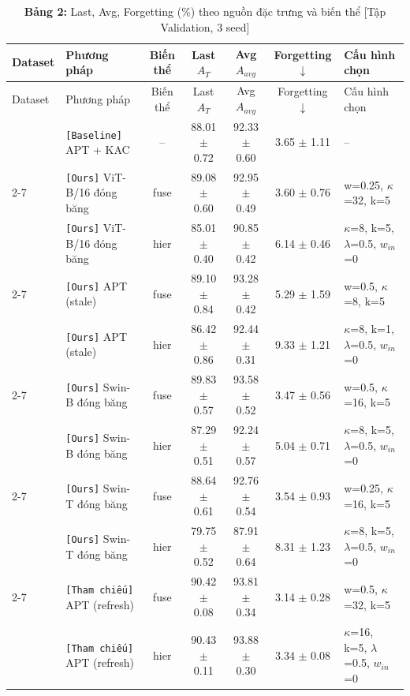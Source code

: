 \documentclass[10pt,a4paper]{article}
\newcommand{\src}[1]{\texttt{[#1]}}
\begin{document}
{\footnotesize
\setlength{\tabcolsep}{3pt}
\begin{longtable}{llcccc l}
\caption{\textbf{Bảng 2:} Last, Avg, Forgetting (\%) theo nguồn đặc trưng và biến thể [Tập Validation, 3 seed]}\\
\toprule
Dataset & Phương pháp & Biến thể & Last $A_T$ & Avg $A_{avg}$ & Forgetting $\downarrow$ & Cấu hình chọn \\
\midrule
\endfirsthead
\toprule
Dataset & Phương pháp & Biến thể & Last $A_T$ & Avg $A_{avg}$ & Forgetting $\downarrow$ & Cấu hình chọn \\
\midrule
\endhead
\bottomrule
\endfoot
\multirow{11}{*}{CIFAR-100} & \src{Baseline} APT + KAC & -- & 88.01 $\pm$ 0.72 & 92.33 $\pm$ 0.60 & 3.65 $\pm$ 1.11 & {\scriptsize --} \\
\cmidrule(l){2-7}
 & \src{Ours} ViT-B/16 đóng băng & fuse & 89.08 $\pm$ 0.60 & 92.95 $\pm$ 0.49 & 3.60 $\pm$ 0.76 & {\scriptsize w=0.25, $\kappa$=32, k=5} \\
 & \src{Ours} ViT-B/16 đóng băng & hier & 85.01 $\pm$ 0.40 & 90.85 $\pm$ 0.42 & 6.14 $\pm$ 0.46 & {\scriptsize $\kappa$=8, k=5, $\lambda$=0.5, $w_{in}$=0} \\
\cmidrule(l){2-7}
 & \src{Ours} APT (stale) & fuse & 89.10 $\pm$ 0.84 & 93.28 $\pm$ 0.42 & 5.29 $\pm$ 1.59 & {\scriptsize w=0.5, $\kappa$=8, k=5} \\
 & \src{Ours} APT (stale) & hier & 86.42 $\pm$ 0.86 & 92.44 $\pm$ 0.31 & 9.33 $\pm$ 1.21 & {\scriptsize $\kappa$=8, k=1, $\lambda$=0.5, $w_{in}$=0} \\
\cmidrule(l){2-7}
 & \src{Ours} Swin-B đóng băng & fuse & 89.83 $\pm$ 0.57 & 93.58 $\pm$ 0.52 & 3.47 $\pm$ 0.56 & {\scriptsize w=0.5, $\kappa$=16, k=5} \\
 & \src{Ours} Swin-B đóng băng & hier & 87.29 $\pm$ 0.51 & 92.24 $\pm$ 0.57 & 5.04 $\pm$ 0.71 & {\scriptsize $\kappa$=8, k=5, $\lambda$=0.5, $w_{in}$=0} \\
\cmidrule(l){2-7}
 & \src{Ours} Swin-T đóng băng & fuse & 88.64 $\pm$ 0.61 & 92.76 $\pm$ 0.54 & 3.54 $\pm$ 0.93 & {\scriptsize w=0.25, $\kappa$=16, k=5} \\
 & \src{Ours} Swin-T đóng băng & hier & 79.75 $\pm$ 0.52 & 87.91 $\pm$ 0.64 & 8.31 $\pm$ 1.23 & {\scriptsize $\kappa$=8, k=5, $\lambda$=0.5, $w_{in}$=0} \\
\cmidrule(l){2-7}
 & \src{Tham chiếu} APT (refresh) & fuse & 90.42 $\pm$ 0.08 & 93.81 $\pm$ 0.34 & 3.14 $\pm$ 0.28 & {\scriptsize w=0.5, $\kappa$=32, k=5} \\
 & \src{Tham chiếu} APT (refresh) & hier & 90.43 $\pm$ 0.11 & 93.88 $\pm$ 0.30 & 3.34 $\pm$ 0.08 & {\scriptsize $\kappa$=16, k=5, $\lambda$=0.5, $w_{in}$=0} \\

\end{longtable}}
\end{document}
